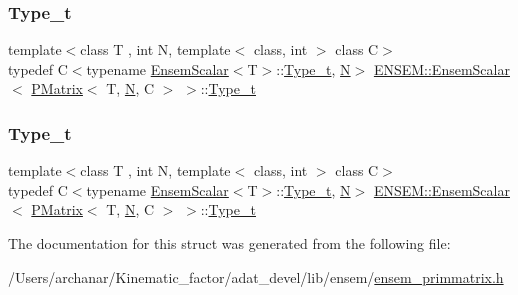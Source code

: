 \subsubsection{\texorpdfstring{Type\_t}{Type\_t}\hspace{0.1cm}{\footnotesize\ttfamily [1/2]}}
{\footnotesize\ttfamily template$<$class T , int N, template$<$ class, int $>$ class C$>$ \\
typedef C$<$typename \mbox{\hyperlink{structENSEM_1_1EnsemScalar}{Ensem\+Scalar}}$<$T$>$\+::\mbox{\hyperlink{structENSEM_1_1EnsemScalar_3_01PMatrix_3_01T_00_01N_00_01C_01_4_01_4_a63cd7ffca7507ffb61823092f6d0f8db}{Type\+\_\+t}}, \mbox{\hyperlink{operator__name__util_8cc_a7722c8ecbb62d99aee7ce68b1752f337}{N}}$>$ \mbox{\hyperlink{structENSEM_1_1EnsemScalar}{E\+N\+S\+E\+M\+::\+Ensem\+Scalar}}$<$ \mbox{\hyperlink{classENSEM_1_1PMatrix}{P\+Matrix}}$<$ T, \mbox{\hyperlink{operator__name__util_8cc_a7722c8ecbb62d99aee7ce68b1752f337}{N}}, C $>$ $>$\+::\mbox{\hyperlink{structENSEM_1_1EnsemScalar_3_01PMatrix_3_01T_00_01N_00_01C_01_4_01_4_a63cd7ffca7507ffb61823092f6d0f8db}{Type\+\_\+t}}}

\mbox{\label{structENSEM_1_1EnsemScalar_3_01PMatrix_3_01T_00_01N_00_01C_01_4_01_4_a63cd7ffca7507ffb61823092f6d0f8db}} 
\subsubsection{\texorpdfstring{Type\_t}{Type\_t}\hspace{0.1cm}{\footnotesize\ttfamily [2/2]}}
{\footnotesize\ttfamily template$<$class T , int N, template$<$ class, int $>$ class C$>$ \\
typedef C$<$typename \mbox{\hyperlink{structENSEM_1_1EnsemScalar}{Ensem\+Scalar}}$<$T$>$\+::\mbox{\hyperlink{structENSEM_1_1EnsemScalar_3_01PMatrix_3_01T_00_01N_00_01C_01_4_01_4_a63cd7ffca7507ffb61823092f6d0f8db}{Type\+\_\+t}}, \mbox{\hyperlink{operator__name__util_8cc_a7722c8ecbb62d99aee7ce68b1752f337}{N}}$>$ \mbox{\hyperlink{structENSEM_1_1EnsemScalar}{E\+N\+S\+E\+M\+::\+Ensem\+Scalar}}$<$ \mbox{\hyperlink{classENSEM_1_1PMatrix}{P\+Matrix}}$<$ T, \mbox{\hyperlink{operator__name__util_8cc_a7722c8ecbb62d99aee7ce68b1752f337}{N}}, C $>$ $>$\+::\mbox{\hyperlink{structENSEM_1_1EnsemScalar_3_01PMatrix_3_01T_00_01N_00_01C_01_4_01_4_a63cd7ffca7507ffb61823092f6d0f8db}{Type\+\_\+t}}}



The documentation for this struct was generated from the following file\+:\begin{DoxyCompactItemize}
\item 
/\+Users/archanar/\+Kinematic\+\_\+factor/adat\+\_\+devel/lib/ensem/\mbox{\hyperlink{lib_2ensem_2ensem__primmatrix_8h}{ensem\+\_\+primmatrix.\+h}}\end{DoxyCompactItemize}
